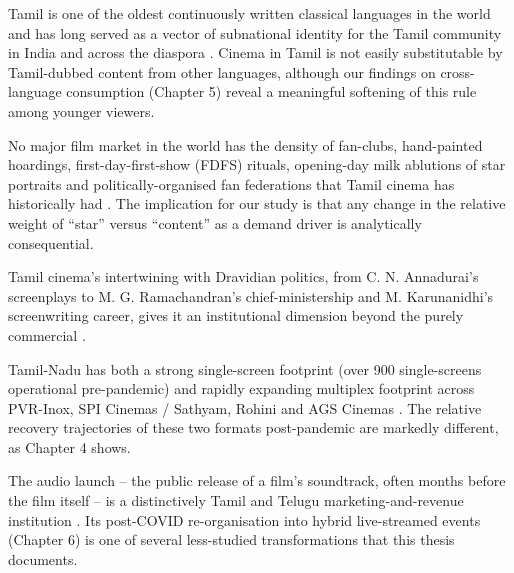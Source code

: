 \begin{description}[style=nextline]
  \item[Linguistic-cultural specificity.]  Tamil is one of the
        oldest continuously written classical languages in the world
        and has long served as a vector of subnational identity for
        the Tamil community in India and across the diaspora
        \citep{ramaswamy1997,baskaran2009}.  Cinema in Tamil is not
        easily substitutable by Tamil-dubbed content from other
        languages, although our findings on cross-language
        consumption (Chapter 5) reveal a meaningful softening of
        this rule among younger viewers.
  \item[Star-system intensity.]  No major film market in the world
        has the density of fan-clubs, hand-painted hoardings,
        first-day-first-show (FDFS) rituals, opening-day milk
        ablutions of star portraits and politically-organised fan
        federations that Tamil cinema has historically had
        \citep{dickey1993,pandian1992,prasad2014}.  The implication
        for our study is that any change in the relative weight of
        ``star'' versus ``content'' as a demand driver is
        analytically consequential.
  \item[Politics-cinema continuum.]  Tamil cinema's intertwining
        with Dravidian politics, from C. N. Annadurai's screenplays
        to M. G. Ramachandran's chief-ministership and M. Karunanidhi's
        screenwriting career, gives it an institutional dimension
        beyond the purely commercial \citep{pandian1992,hardgrave1973}.
  \item[Distinctive exhibition geography.]  Tamil-Nadu has both a
        strong single-screen footprint (over 900 single-screens
        operational pre-pandemic) and rapidly expanding multiplex
        footprint across PVR-Inox, SPI Cinemas / Sathyam, Rohini and
        AGS Cinemas \citep{kohlikhandekar2013,ficciey2022}.  The
        relative recovery trajectories of these two formats post-pandemic
        are markedly different, as Chapter 4 shows.
  \item[Music-led marketing.]  The audio launch -- the public
        release of a film's soundtrack, often months before the film
        itself -- is a distinctively Tamil and Telugu
        marketing-and-revenue institution
        \citep{velayutham2008,baskaran1996}.  Its post-COVID
        re-organisation into hybrid live-streamed events
        (Chapter 6) is one of several less-studied transformations
        that this thesis documents.
\end{description}

